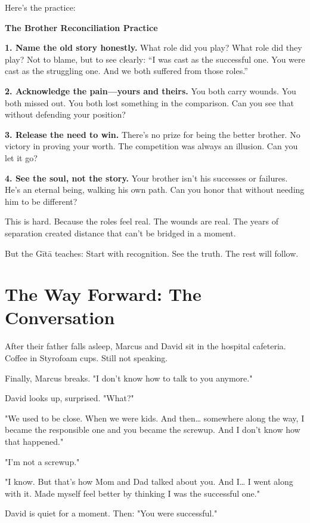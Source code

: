 \documentclass[11pt,twoside]{book}
\begin{document}
Here's the practice:

\begin{practicebox}
\textbf{The Brother Reconciliation Practice}

\textbf{1. Name the old story honestly.}
What role did you play? What role did they play? Not to blame, but to see clearly: ``I was cast as the successful one. You were cast as the struggling one. And we both suffered from those roles.''

\textbf{2. Acknowledge the pain—yours and theirs.}
You both carry wounds. You both missed out. You both lost something in the comparison. Can you see that without defending your position?

\textbf{3. Release the need to win.}
There's no prize for being the better brother. No victory in proving your worth. The competition was always an illusion. Can you let it go?

\textbf{4. See the soul, not the story.}
Your brother isn't his successes or failures. He's an eternal being, walking his own path. Can you honor that without needing him to be different?
\end{practicebox}

This is hard. Because the roles feel real. The wounds are real. The years of separation created distance that can't be bridged in a moment.

But the Gītā teaches: Start with recognition. See the truth. The rest will follow.

\section*{The Way Forward: The Conversation}

After their father falls asleep, Marcus and David sit in the hospital cafeteria. Coffee in Styrofoam cups. Still not speaking.

Finally, Marcus breaks. "I don't know how to talk to you anymore."

David looks up, surprised. "What?"

"We used to be close. When we were kids. And then\ldots{} somewhere along the way, I became the responsible one and you became the screwup. And I don't know how that happened."

"I'm not a screwup."

"I know. But that's how Mom and Dad talked about you. And I\ldots{} I went along with it. Made myself feel better by thinking I was the successful one."

David is quiet for a moment. Then: "You were successful."
\end{document}
